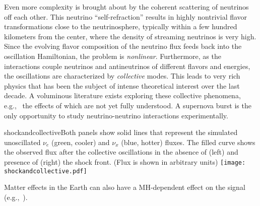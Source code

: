 Even more complexity is brought about by the coherent scattering of neutrinos off each other. This neutrino ``self-refraction'' 
 results in highly nontrivial flavor transformations close to the neutrinosphere, typically within a few hundred kilometers from the center, where the density of streaming neutrinos is very high. Since the evolving flavor composition of the neutrino flux feeds back into the oscillation Hamiltonian, the problem is \emph{nonlinear}. Furthermore, as the interactions couple neutrinos and antineutrinos of different flavors and energies, the oscillations are characterized by \emph{collective} modes.  %
This leads to very rich physics that has been the subject of intense theoretical interest over the last decade. A voluminous literature exists exploring these collective phenomena,
e.g.,~\cite{Duan:2005cp,Fogli:2007bk,Raffelt:2007cb,Raffelt:2007xt,EstebanPretel:2008ni,
Duan:2009cd,Dasgupta:2009mg,Duan:2010bg,Duan:2010bf,Wu:2014kaa} the effects of which are not yet fully understood. 
A supernova burst is the only opportunity to study neutrino-neutrino interactions experimentally.

\begin{cdrfigure}{shockandcollective}{Both panels show solid lines that represent the simulated unoscillated $\nu_e$ (green, cooler) and $\nu_x$ (blue, hotter) fluxes. The filled curve shows the observed flux after the collective oscillations in the absence of (left) and presence of (right) the shock front. (Flux is shown in arbitrary units)}
\texttt{[image: shockandcollective.pdf]}
\end{cdrfigure}

Matter effects in the Earth can also have a MH-dependent effect on the signal (e.g.,~\cite{Choubey:2010up}).

